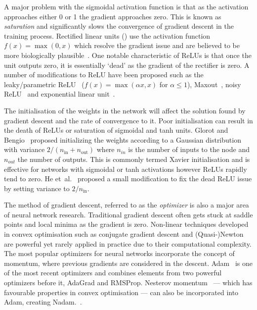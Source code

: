 \documentclass[12pt, twoside]{book}
\renewcommand\emph[1]{\textit{\color{USred}{#1}}}
\begin{document}
A major problem with the sigmoidal activation function is that as the activation approaches either 0 or 1 the gradient approaches zero. This is known as \textit{saturation} and significantly slows the convergence of gradient descent in the training process. Rectified linear units (\emph{ReLUs}) use the activation function $f(x) = \max(0,x)$ which resolve the gradient issue and are believed to be more biologically plausible~\cite{relu,relubiology}. One notable characteristic of ReLUs is that once the unit outputs zero, it is essentially `dead' as the gradient of the rectifier is zero. A number of modifications to ReLU have been proposed such as the leaky/parametric ReLU~\cite{he2015delving} ($f(x) = \max(\alpha x, x)$ for $\alpha\leq 1$), Maxout~\cite{goodfellow2013maxout}, noisy ReLU~\cite{noisyrelu} and exponential linear unit~\cite{clevert2015fast}.

The initialisation of the weights in the network will affect the solution found by gradient descent and the rate of convergence to it. Poor initialisation can result in the death of ReLUs or saturation of sigmoidal and tanh units. Glorot and Bengio~\cite{glorot2010understanding} proposed initializing the weights according to a Gaussian distribution with variance $2/(n_{\text{in}}+n_{\text{out}})$ where $n_{in}$ is the number of inputs to the node and $n_{out}$ the number of outputs. This is commonly termed Xavier initialisation and is effective for networks with sigmoidal or tanh activations however ReLUs rapidly tend to zero. He et~al.~\cite{he2015delving} proposed a small modification to fix the dead ReLU issue by setting variance to $2/n_{\text{in}}$.

The method of gradient descent, referred to as the \textit{optimizer} is also a major area of neural network research. Traditional gradient descent often gets stuck at saddle points and local minima as the gradient is zero. Non-linear techniques developed in convex optimisation such as conjugate gradient descent and (Quasi-)Newton are powerful yet rarely applied in practice due to their computational complexity. The most popular optimizers for neural networks incorporate the concept of momentum, where previous gradients are considered in the descent. Adam~\cite{adam} is one of the most recent optimizers and combines elements from two powerful optimizers before it, AdaGrad and RMSProp. Nesterov momentum~\cite{nesterov1983method} --- which has favourable properties in convex optimisation --- can also be incorporated into Adam, creating Nadam.~\cite{nadam}. 
\end{document}
